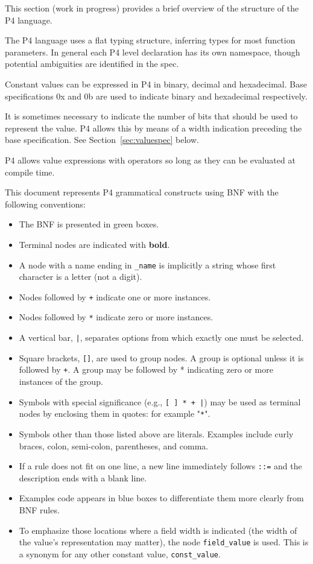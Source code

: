 \documentclass[12pt]{article}
\begin{document}

This section (work in progress) provides a brief overview of the structure
of the P4 language.

The P4 language uses a flat typing structure, inferring types for most function
parameters. In general each P4 level declaration has its own namespace, though
potential ambiguities are identified in the spec.

Constant values can be expressed in P4 in binary, decimal and hexadecimal.
Base specifications 0x and 0b are used to indicate binary and hexadecimal
respectively.

It is sometimes necessary to indicate the number of bits that should be used
to represent the value.  P4 allows this by means of a width indication preceding
the base specification. See Section~\ref{sec:valuespec} below.

P4 allows value expressions with operators so long as they can be evaluated
at compile time.


This document represents P4 grammatical constructs using BNF with the
following conventions:

\begin{itemize}
\item
The BNF is presented in green boxes.
\item
Terminal nodes are indicated with \textbf{bold}.
\item
A node with a name ending in \texttt{_name} is implicitly a string whose first character
is a letter (not a digit).
\item
Nodes followed by \texttt{+} indicate one or more instances.
\item
Nodes followed by \texttt{*} indicate zero or more instances.
\item
A vertical bar, \texttt{|}, separates options from which exactly one must be selected.
\item
Square brackets, \texttt{[]}, are used to group nodes. A group is optional unless
it is followed by \texttt{+}. A group may be followed by * indicating zero or more
instances of the group.
\item
Symbols with special significance (e.g., \texttt{[ ] * + |}) may be used as terminal
nodes by enclosing them in quotes: for example "\texttt{*}".
\item
Symbols other than those listed above are literals. Examples include curly
braces, colon, semi-colon, parentheses, and comma.
\item
If a rule does not fit on one line, a new line immediately follows \texttt{::=} and
the description ends with a blank line.
\item
Examples code appears in blue boxes to differentiate them more clearly
from BNF rules.
\item
To emphasize those locations where a field width is indicated (the width of
the value's representation may matter), the node \texttt{field_value} is used. This
is a synonym for any other constant value, \texttt{const_value}.
\end{itemize}
\end{document}
